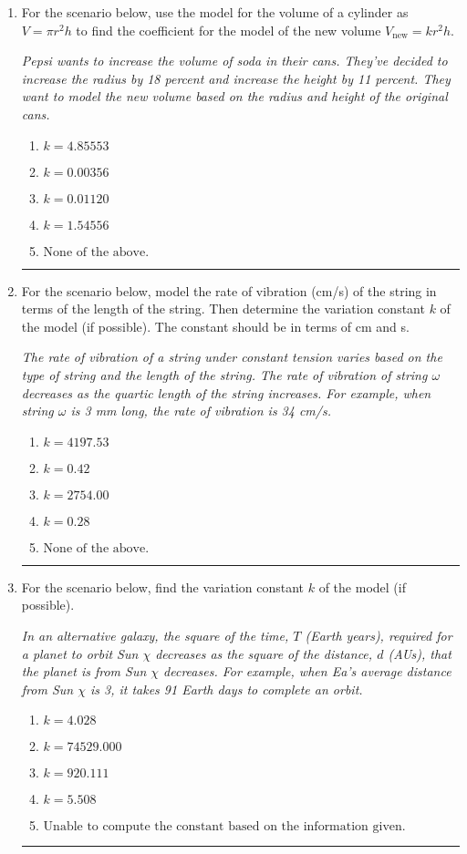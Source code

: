\documentclass[14pt]{extbook}
\newcommand{\litem}[1]{\item#1\hspace*{-1cm}\rule{\textwidth}{0.4pt}}
\begin{document}
\begin{enumerate}
{\begin{enumerate}[label=\Alph*.]
\end{enumerate} }
\litem{
For the scenario below, use the model for the volume of a cylinder as $V = \pi r^2 h$ to find the coefficient for the model of the new volume $V_{\text{new}} = k r^2 h$.
\begin{center}
    \textit{ Pepsi wants to increase the volume of soda in their cans. They've decided to increase the radius by 18 percent and increase the height by 11 percent. They want to model the new volume based on the radius and height of the original cans. }
\end{center}
\begin{enumerate}[label=\Alph*.]
\item \( k = 4.85553 \)
\item \( k = 0.00356 \)
\item \( k = 0.01120 \)
\item \( k = 1.54556 \)
\item \( \text{None of the above.} \)

\end{enumerate} }
\litem{
For the scenario below, model the rate of vibration (cm/s) of the string in terms of the length of the string. Then determine the variation constant $k$ of the model (if possible). The constant should be in terms of cm and s.
\begin{center}
    \textit{ The rate of vibration of a string under constant tension varies based on the type of string and the length of the string. The rate of vibration of string $\omega$ decreases as the quartic length of the string increases. For example, when string $\omega$ is 3 mm long, the rate of vibration is 34 cm/s. }
\end{center}
\begin{enumerate}[label=\Alph*.]
\item \( k = 4197.53 \)
\item \( k = 0.42 \)
\item \( k = 2754.00 \)
\item \( k = 0.28 \)
\item \( \text{None of the above.} \)

\end{enumerate} }
\litem{
For the scenario below, find the variation constant $k$ of the model (if possible).
\begin{center}
    \textit{ In an alternative galaxy, the square of the time, $T$ (Earth years), required for a planet to orbit Sun $\chi$ decreases as the square of the distance, $d$ (AUs), that the planet is from Sun $\chi$ decreases. For example, when Ea's average distance from Sun $\chi$ is 3, it takes 91 Earth days to complete an orbit. }
\end{center}
\begin{enumerate}[label=\Alph*.]
\item \( k = 4.028 \)
\item \( k = 74529.000 \)
\item \( k = 920.111 \)
\item \( k = 5.508 \)
\item \( \text{Unable to compute the constant based on the information given.} \)


\end{enumerate}}
\end{enumerate}
\end{document}
